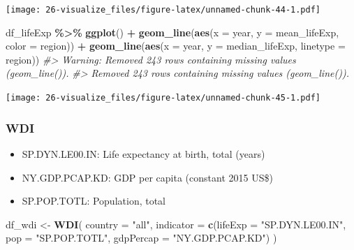 \documentclass[
  xelatex, ja=standard]{bxjsbook}
\newenvironment{Shaded}{\begin{snugshade}}{\end{snugshade}}
\newcommand{\AttributeTok}[1]{\textcolor[rgb]{0.13,0.29,0.53}{#1}}
\newcommand{\CommentTok}[1]{\textcolor[rgb]{0.56,0.35,0.01}{\textit{#1}}}
\newcommand{\FunctionTok}[1]{\textcolor[rgb]{0.13,0.29,0.53}{\textbf{#1}}}
\newcommand{\NormalTok}[1]{#1}
\newcommand{\OtherTok}[1]{\textcolor[rgb]{0.56,0.35,0.01}{#1}}
\newcommand{\SpecialCharTok}[1]{\textcolor[rgb]{0.81,0.36,0.00}{\textbf{#1}}}
\newcommand{\StringTok}[1]{\textcolor[rgb]{0.31,0.60,0.02}{#1}}
\providecommand{\tightlist}{%
  \setlength{\itemsep}{0pt}\setlength{\parskip}{0pt}}
\theoremstyle{definition}
\theoremstyle{definition}
\theoremstyle{definition}
\theoremstyle{definition}
\theoremstyle{remark}
\begin{document}
\texttt{[image: 26-visualize\_files/figure-latex/unnamed-chunk-44-1.pdf]}

\begin{Shaded}
\begin{Highlighting}[]
\NormalTok{df\_lifeExp }\SpecialCharTok{\%\textgreater{}\%} \FunctionTok{ggplot}\NormalTok{() }\SpecialCharTok{+}
  \FunctionTok{geom\_line}\NormalTok{(}\FunctionTok{aes}\NormalTok{(}\AttributeTok{x =}\NormalTok{ year, }\AttributeTok{y =}\NormalTok{ mean\_lifeExp, }\AttributeTok{color =}\NormalTok{ region)) }\SpecialCharTok{+} 
  \FunctionTok{geom\_line}\NormalTok{(}\FunctionTok{aes}\NormalTok{(}\AttributeTok{x =}\NormalTok{ year, }\AttributeTok{y =}\NormalTok{ median\_lifeExp, }\AttributeTok{linetype =}\NormalTok{ region))}
\CommentTok{\#\textgreater{} Warning: Removed 243 rows containing missing values (\textasciigrave{}geom\_line()\textasciigrave{}).}
\CommentTok{\#\textgreater{} Removed 243 rows containing missing values (\textasciigrave{}geom\_line()\textasciigrave{}).}
\end{Highlighting}
\end{Shaded}

\texttt{[image: 26-visualize\_files/figure-latex/unnamed-chunk-45-1.pdf]}

\hypertarget{wdi-1}{%
\subsubsection{WDI}\label{wdi-1}}

\begin{itemize}
\tightlist
\item
  SP.DYN.LE00.IN: Life expectancy at birth, total (years)
\item
  NY.GDP.PCAP.KD: GDP per capita (constant 2015 US\$)
\item
  SP.POP.TOTL: Population, total
\end{itemize}

\begin{Shaded}
\begin{Highlighting}[]
\NormalTok{df\_wdi }\OtherTok{\textless{}{-}} \FunctionTok{WDI}\NormalTok{(}
  \AttributeTok{country =} \StringTok{"all"}\NormalTok{, }
  \AttributeTok{indicator =} \FunctionTok{c}\NormalTok{(}\AttributeTok{lifeExp =} \StringTok{"SP.DYN.LE00.IN"}\NormalTok{, }\AttributeTok{pop =} \StringTok{"SP.POP.TOTL"}\NormalTok{, }\AttributeTok{gdpPercap =} \StringTok{"NY.GDP.PCAP.KD"}\NormalTok{)}
\NormalTok{)}
\end{Highlighting}
\end{Shaded}
\end{document}
